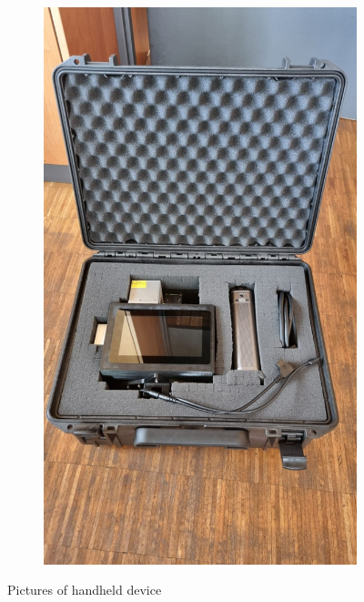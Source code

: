 \documentclass[english, bachelor, utf8]{base/thesis_telematics}
\begin{document}
\begin{figure}[h!]
\begin{subfigure}[b]{0.4\textwidth}
        \includegraphics[width=\textwidth]{pics/handheld/WhatsApp Image 2025-09-16 at 15.05.10(1).jpeg}
    \end{subfigure}
    \caption{Pictures of handheld device}
    \label{fig:handheld_device}
\end{figure}
\end{document}
